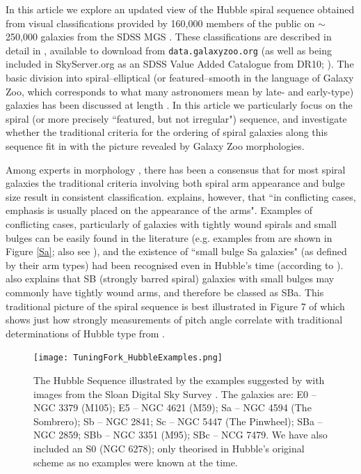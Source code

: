 \documentclass[usenatbib]{mn2e}
\begin{document}
 In this article we explore an updated view of the Hubble spiral sequence obtained from visual classifications provided by 160,000 members of the public on $\sim$ 250,000 galaxies from the SDSS MGS \citep{Strauss2002}. These classifications are described in detail in \citet{Willett2013}, available to download from {\tt data.galaxyzoo.org} (as well as being included in SkyServer.org as an SDSS Value Added Catalogue from DR10; \citealt{DR10}). The basic division into spiral--elliptical (or featured--smooth in the language of Galaxy Zoo, which corresponds to what many astronomers mean by late- and early-type) galaxies has been discussed at length \citep[e.g.][]{Willett2013}. In this article we particularly focus on the spiral (or more precisely ``featured, but not irregular") sequence, and investigate whether the traditional criteria for the ordering of spiral galaxies along this sequence fit in with the picture revealed by Galaxy Zoo morphologies. 

Among experts in morphology \citep[e.g.][]{Sandage2005,Buta2013}, there has been a consensus that for most spiral galaxies the traditional criteria involving both spiral arm appearance and bulge size result in consistent classification. \citet{Buta2013} explains, however, that ``in conflicting cases, emphasis is usually placed on the appearance of the arms". Examples of conflicting cases, particularly of galaxies with tightly wound spirals and small bulges can be easily  found in the literature (e.g. examples from \citealt{Hogg1993} are shown in Figure \ref{Sa}; also see \citealt{Sandage1961, SandageBedke1994, Jore1996}), and the existence of ``small bulge Sa galaxies" (as defined by their arm types) had been recognised even in Hubble's time (according to \citealt{Sandage2005}). \citet{Buta2013} also explains that SB (strongly barred spiral) galaxies with small bulges may commonly have tightly wound arms, and therefore be classed as SBa. This traditional picture of the spiral sequence is best illustrated in Figure 7 of \citet{kennicutt1981} which shows just how strongly measurements of pitch angle correlate with traditional determinations of Hubble type from \citet{sandagetammann1981}. 

\begin{landscape}
\begin{figure}
\texttt{[image: TuningFork\_HubbleExamples.png]}
\caption{The Hubble Sequence illustrated by the examples suggested by \citet{Hubble1926} with images from the Sloan Digital Sky Survey \citep[SDSS; ][]{York2000}. The galaxies are: E0 -- NGC 3379 (M105); E5 -- NGC 4621 (M59);  Sa -- NGC 4594 (The Sombrero);  Sb -- NGC 2841; Sc -- NGC 5447 (The Pinwheel); SBa -- NGC 2859; SBb -- NGC 3351 (M95); SBc -- NCG 7479. We have also included an S0 (NGC 6278); only theorised in Hubble's original scheme as no examples were known at the time. \label{sequence}}
\end{figure}
\end{landscape}
\end{document}
